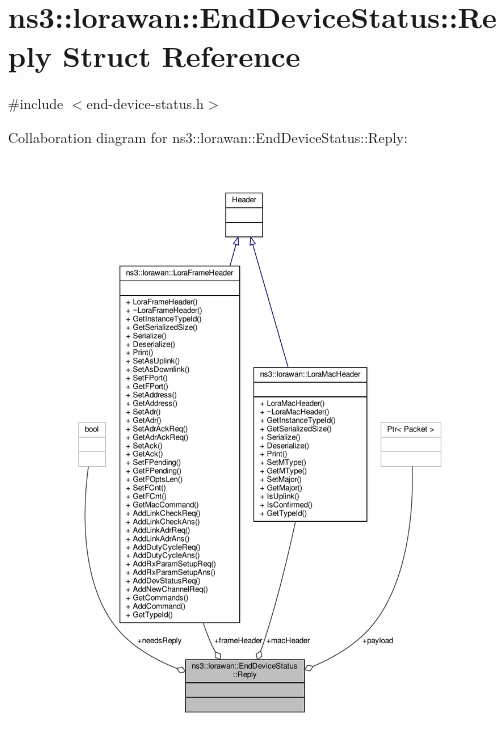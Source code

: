 \hypertarget{structns3_1_1lorawan_1_1EndDeviceStatus_1_1Reply}{}\section{ns3\+:\+:lorawan\+:\+:End\+Device\+Status\+:\+:Reply Struct Reference}
\label{structns3_1_1lorawan_1_1EndDeviceStatus_1_1Reply}


{\ttfamily \#include $<$end-\/device-\/status.\+h$>$}



Collaboration diagram for ns3\+:\+:lorawan\+:\+:End\+Device\+Status\+:\+:Reply\+:
\nopagebreak
\begin{figure}[H]
\begin{center}
\leavevmode
\includegraphics[width=350pt]{structns3_1_1lorawan_1_1EndDeviceStatus_1_1Reply__coll__graph}
\end{center}
\end{figure}
